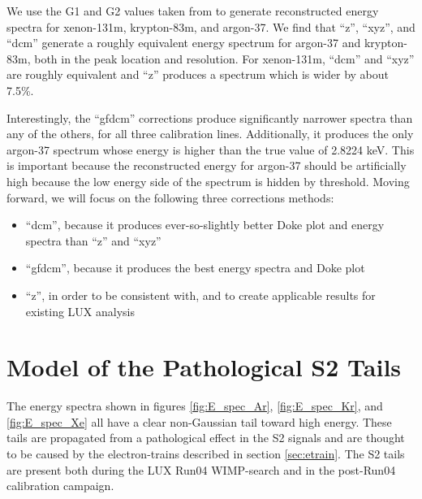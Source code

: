 We use the G1 and G2 values taken from to generate reconstructed energy spectra for xenon-131m, krypton-83m, and argon-37. We find that ``z'', ``xyz'', and ``dcm'' generate a roughly equivalent energy spectrum for argon-37 and krypton-83m, both in the peak location and resolution. For xenon-131m, ``dcm'' and ``xyz'' are roughly equivalent and ``z'' produces a spectrum which is wider by about 7.5\%. 

Interestingly, the ``gfdcm'' corrections produce significantly narrower spectra than any of the others, for all three calibration lines. Additionally, it produces the only argon-37 spectrum whose energy is higher than the true value of 2.8224 keV. This is important because the reconstructed energy for argon-37 should be artificially high because the low energy side of the spectrum is hidden by threshold. Moving forward, we will focus on the following three corrections methods: 
\begin{itemize}
\item ``dcm'', because it produces ever-so-slightly better Doke plot and energy spectra than ``z'' and ``xyz''
\item ``gfdcm'', because it produces the best energy spectra and Doke plot
\item ``z'', in order to be consistent with, and to create applicable results for existing LUX analysis
\end{itemize}



\section{Model of the Pathological S2 Tails}\label{sec:s2tails}
The energy spectra shown in figures \ref{fig:E_spec_Ar}, \ref{fig:E_spec_Kr}, and \ref{fig:E_spec_Xe} all have a clear non-Gaussian tail toward high energy. These tails are propagated from a pathological effect in the S2 signals and are thought to be caused by the electron-trains described in section \ref{sec:etrain}. The S2 tails are present both during the LUX Run04 WIMP-search and in the post-Run04 calibration campaign. 

